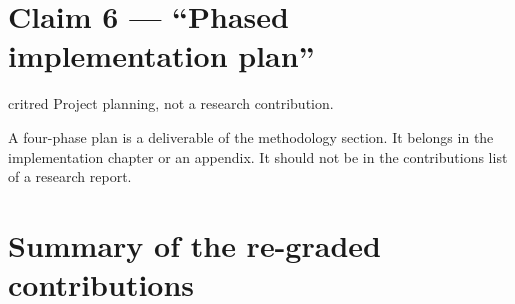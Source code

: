 \documentclass[11pt, a4paper]{report}
\begin{document}
\section{Claim 6 --- ``Phased implementation plan''}

\begin{gradebox}{critred}
Project planning, not a research contribution.
\end{gradebox}

A four-phase plan is a deliverable of the methodology section. It belongs
in the implementation chapter or an appendix. It should not be in the
contributions list of a research report.

\section{Summary of the re-graded contributions}
\end{document}
